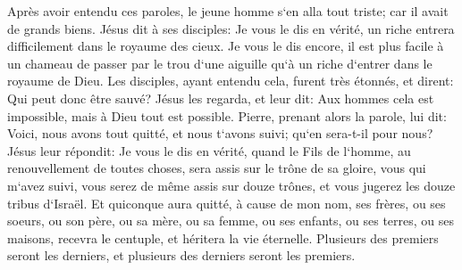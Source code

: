 \verse Après avoir entendu ces paroles, le jeune homme s`en alla tout triste; car il avait de grands biens. 
\verse Jésus dit à ses disciples: Je vous le dis en vérité, un riche entrera difficilement dans le royaume des cieux. 
\verse Je vous le dis encore, il est plus facile à un chameau de passer par le trou d`une aiguille qu`à un riche d`entrer dans le royaume de Dieu. 
\verse Les disciples, ayant entendu cela, furent très étonnés, et dirent: Qui peut donc être sauvé? 
\verse Jésus les regarda, et leur dit: Aux hommes cela est impossible, mais à Dieu tout est possible. 
\verse Pierre, prenant alors la parole, lui dit: Voici, nous avons tout quitté, et nous t`avons suivi; qu`en sera-t-il pour nous? 
\verse Jésus leur répondit: Je vous le dis en vérité, quand le Fils de l`homme, au renouvellement de toutes choses, sera assis sur le trône de sa gloire, vous qui m`avez suivi, vous serez de même assis sur douze trônes, et vous jugerez les douze tribus d`Israël. 
\verse Et quiconque aura quitté, à cause de mon nom, ses frères, ou ses soeurs, ou son père, ou sa mère, ou sa femme, ou ses enfants, ou ses terres, ou ses maisons, recevra le centuple, et héritera la vie éternelle. 
\verse Plusieurs des premiers seront les derniers, et plusieurs des derniers seront les premiers. 

\chapter{}

